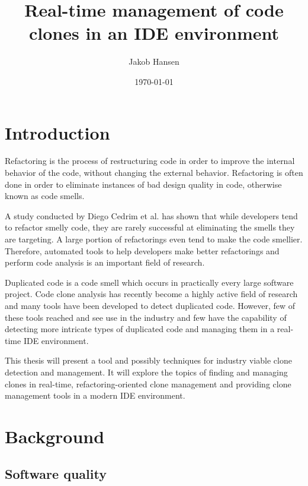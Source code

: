\documentclass[12pt]{article}
\title{\vspace{-20px}Real-time management of code clones in an IDE environment}
\author{Jakob Hansen}
\date{\today}
\begin{document}
\maketitle

\newpage

\tableofcontents

\newpage

\section{Introduction}

Refactoring is the process of restructuring code in order to improve the internal behavior
of the code, without changing the external behavior\cite[9]{fowlerrefactoring}.
Refactoring is often done in order to eliminate instances of bad design quality in code,
otherwise known as code smells.  

A study conducted by Diego Cedrim et al. has shown that while developers tend to refactor
smelly code, they are rarely successful at eliminating the smells they are
targeting\cite{Rohit_Gheyi_Impact}. A large portion of refactorings even tend to make the
code smellier. Therefore, automated tools to help developers make better refactorings and
perform code analysis is an important field of research.

Duplicated code is a code smell which occurs in practically every large software project.
Code clone analysis has recently become a highly active field of research and many tools have
been developed to detect duplicated code\cite[7]{Inoue_introduction_to_cc}. However, few of
these tools reached and see use in the industry and few have the capability of detecting
more intricate types of duplicated code and managing them in a real-time IDE environment.

This thesis will present a tool and possibly techniques for industry viable clone
detection and management. It will explore the topics of finding and managing clones in
real-time, refactoring-oriented clone management and providing clone management tools in a
modern IDE environment.

\section{Background}

\subsection{Software quality}
\end{document}
